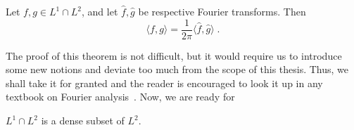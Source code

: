 \begin{theorem}

    Let \(f,g \in L^1 \cap L^2\), and let \(\hat{f},\hat{g}\) be respective Fourier transforms. Then
    \begin{equation*}
        \langle f,g \rangle = \frac{1}{2\pi }\langle \hat{f} ,\hat{g}  \rangle  \; .
    \end{equation*}
\end{theorem}
The proof of this theorem is not difficult, but it would require us to introduce some new notions and deviate
too much from the scope of this thesis. Thus, we shall take it for granted and the reader is encouraged to
look it up in any textbook on Fourier analysis~\autocite{Rudin1987,Stein2011}. Now, we are ready for
\begin{theorem}
    \(L^1 \cap L^2\) is a dense subset of \(L^2\).
\end{theorem}
